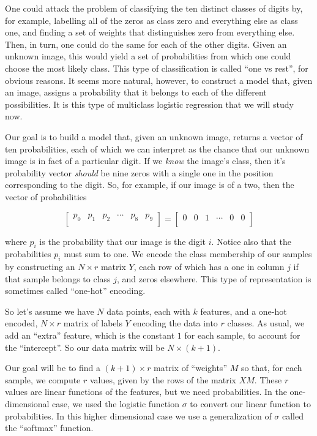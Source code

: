 \documentclass[
  11pt,
  letterpaper,
]{scrbook}
\theoremstyle{plain}
\theoremstyle{plain}
\theoremstyle{remark}
\begin{document}
One could attack the problem of classifying the ten distinct classes of
digits by, for example, labelling all of the zeros as class zero and
everything else as class one, and finding a set of weights that
distinguishes zero from everything else. Then, in turn, one could do the
same for each of the other digits. Given an unknown image, this would
yield a set of probabilities from which one could choose the most likely
class. This type of classification is called ``one vs rest'', for
obvious reasons. It seems more natural, however, to construct a model
that, given an image, assigns a probability that it belongs to each of
the different possibilities. It is this type of multiclass logistic
regression that we will study now.

Our goal is to build a model that, given an unknown image, returns a
vector of ten probabilities, each of which we can interpret as the
chance that our unknown image is in fact of a particular digit. If we
\emph{know} the image's class, then it's probability vector
\emph{should} be nine zeros with a single one in the position
corresponding to the digit. So, for example, if our image is of a two,
then the vector of probabilities

\[
\left[ \begin{matrix} p_0 & p_1 & p_2 &\cdots & p_8 & p_9\\\end{matrix}\right]=\left[\begin{matrix} 0 &0 & 1 & \cdots & 0 & 0\\\end{matrix}\right]
\]

where \(p_i\) is the probability that our image is the digit \(i\).
Notice also that the probabilities \(p_i\) must sum to one. We encode
the class membership of our samples by constructing an \(N\times r\)
matrix \(Y\), each row of which has a one in column \(j\) if that sample
belongs to class \(j\), and zeros elsewhere. This type of representation
is sometimes called ``one-hot'' encoding.

So let's assume we have \(N\) data points, each with \(k\) features, and
a one-hot encoded, \(N\times r\) matrix of labels \(Y\) encoding the
data into \(r\) classes. As usual, we add an ``extra'' feature, which is
the constant \(1\) for each sample, to account for the ``intercept''. So
our data matrix will be \(N\times (k+1)\).

Our goal will be to find a \((k+1)\times r\) matrix of ``weights'' \(M\)
so that, for each sample, we compute \(r\) values, given by the rows of
the matrix \(XM\). These \(r\) values are linear functions of the
features, but we need probabilities. In the one-dimensional case, we
used the logistic function \(\sigma\) to convert our linear function to
probabilities. In this higher dimensional case we use a generalization
of \(\sigma\) called the ``softmax'' function.
\end{document}
